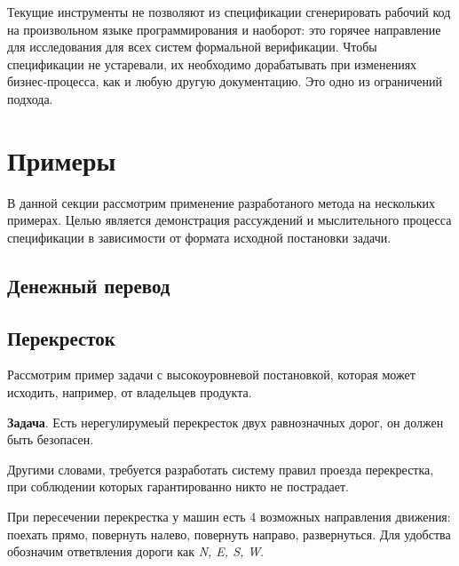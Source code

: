 \documentclass[14pt, openany]{report}
\begin{document}
Текущие инструменты не позволяют из спецификации сгенерировать рабочий код на произвольном языке программирования и наоборот: это горячее направление для исследования для всех систем формальной верификации. Чтобы спецификации не устаревали, их необходимо дорабатывать при изменениях бизнес-процесса, как и любую другую документацию. Это одно из ограничений подхода.

\section{Примеры}
В данной секции рассмотрим применение разработаного метода на нескольких примерах.
Целью является демонстрация рассуждений и мыслительного процесса спецификации в зависимости от формата исходной постановки задачи.

\subsection{Денежный перевод}

\subsection{Перекресток}
Рассмотрим пример задачи с высокоуровневой постановкой, которая может исходить, например, от владельцев продукта.

\textbf{Задача}. Есть нерегулирумеый перекресток двух равнозначных дорог, он должен быть безопасен.

Другими словами, требуется разработать систему правил проезда перекрестка, при соблюдении которых гарантированно никто не пострадает.

При пересечении перекрестка у машин есть 4 возможных направления движения: поехать прямо, повернуть налево, повернуть направо, развернуться. Для удобства обозначим ответвления дороги как \emph{N, E, S, W}. 
\end{document}

